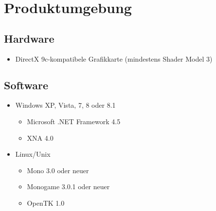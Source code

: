 \chapter{Produktumgebung}



\section{Hardware}

\begin{itemize}
\item DirectX 9c-kompatibele Grafikkarte (mindestens Shader Model 3)
\end{itemize}




\section{Software}

\begin{itemize} 
\item Windows XP, Vista, 7, 8 oder 8.1
\begin{itemize}
\item Microsoft .NET Framework 4.5 
\item XNA 4.0
\end{itemize}
\item Linux/Unix
\begin{itemize}
\item Mono 3.0 oder neuer
\item Monogame 3.0.1 oder neuer
\item OpenTK 1.0
\end{itemize}
\end{itemize}


